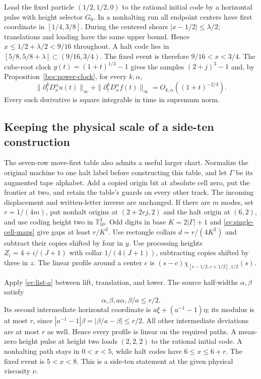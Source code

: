 Load the fixed particle $(1/2,1/2,0)$ to the rational initial code
by a horizontal pulse with height selector $G_0$.  In a nonhalting
run all endpoint centers have first coordinate in $[1/4,3/8]$.
During the centered shears $|x-1/2|\le\lambda/2$; translations
and loading have the same upper bound.  Hence
$x\le1/2+\lambda/2<9/16$ throughout.  A halt code lies in
$[5/8,5/8+\lambda]\subset(9/16,3/4)$.
The fixed event is therefore $9/16<x<3/4$.
The cube-root clock $g(t)=(1+t)^{1/3}-1$ gives the samples
$(2+j)^3-1$ and, by Proposition~\ref{bcs:power-clock}, for every $k,\alpha$,
\[
 \|\partial_t^kD_x^\alpha u(t)\|_\infty+
 \|\partial_t^kD_x^\alpha f(t)\|_\infty
 =O_{k,\alpha}((1+t)^{-2/3}).
\]
Every such derivative is square integrable in time in supremum norm.

\subsection{Keeping the physical scale of a side-ten construction}
\label{sv:side-ten}
The seven-row move-first table also admits a useful larger chart.
Normalize the original machine to one halt label before constructing
this table, and let $\Gamma$ be its augmented tape alphabet.
Add a copied origin bit at absolute cell zero, put the frontier at two,
and retain the table's guards on every other track.  The incoming
displacement and written-letter inverse are unchanged.  If there are
$m$ modes, set $r=1/(4m)$, put nonhalt origins at $(2+2rj,2)$
and the halt origin at $(6,2)$, and use coding height two in
$\mathbb T_{10}^3$.  Odd digits in base $K=2|\Gamma|+1$ and
\eqref{sv:single-cell-maps} give gaps at least $r/K^2$.
Use rectangle collars $d=r/(4K^2)$ and subtract their copies shifted
by four in $y$.  Use processing heights $Z_i=4+i/(J+1)$ with
collar $1/(4(J+1))$, subtracting copies shifted by three in $z$.
The linear profile around a center $c$ is
$(s-c)\chi_{[c-1/2,c+1/2],1/2}(s)$.

Apply \eqref{sv:list-a} between lift, translation, and lower.  The
source half-widths $\alpha,\beta$ satisfy
\[
 \alpha,\beta,a\alpha,\beta/a\le r/2.
\]
Its second
intermediate horizontal coordinate is
$a\xi+(a^{-1}-1)\eta$; its modulus is at most $r$, since
$|a^{-1}-1|\beta=|\beta/a-\beta|\le r/2$.
All other intermediate deviations are at most $r$ as well.
Hence every profile is linear on the required paths.
A mean-zero height pulse at height two loads $(2,2,2)$ to the rational
initial code.  A nonhalting path stays in $0<x<5$, while halt codes
have $6\le x\le6+r$.  The fixed event is $5<x<8$.
This is a side-ten statement at the given physical viscosity $\nu$.

